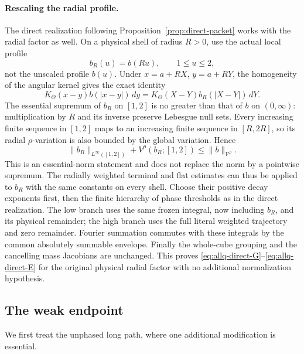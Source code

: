 \documentclass[11pt]{article}
\numberwithin{equation}{section}
\theoremstyle{remark}
\theoremstyle{definition}
\begin{document}
\paragraph{Rescaling the radial profile.}
The direct realization following Proposition~\ref{prop:direct-packet}
works with the radial factor as well.  On a physical shell of radius
$R>0$, use the actual local profile
\[
 b_R(u)=b(Ru),\qquad 1\le u\le2,
\]
not the unscaled profile $b(u)$.  Under $x=a+RX$, $y=a+RY$,
the homogeneity of the angular kernel gives the exact identity
\[
 K_\Theta(x-y)b(|x-y|)\,dy
 =K_\Theta(X-Y)b_R(|X-Y|)\,dY.
\]
The essential supremum of $b_R$ on $[1,2]$ is no greater than that of
$b$ on $(0,\infty)$: multiplication by $R$ and its inverse preserve
Lebesgue null sets.  Every increasing finite sequence in $[1,2]$
maps to an increasing finite sequence in $[R,2R]$, so its radial
$\rho$-variation is also bounded by the global variation.  Hence
\[
 \|b_R\|_{L^\infty([1,2])}+V^\rho(b_R;[1,2])
 \le \|b\|_{\mathcal V^\rho}.
\]
This is an essential-norm statement and does not replace the norm by a
pointwise supremum.  The radially weighted terminal and flat estimates
can thus be applied to $b_R$ with the same constants on every shell.
Choose their positive decay exponents first, then the finite hierarchy
of phase thresholds as in the direct realization.  The low branch uses
the same frozen integral, now including $b_R$, and its physical
remainder; the high branch uses the full literal weighted trajectory
and zero remainder.  Fourier summation commutes with these integrals
by the common absolutely summable envelope.  Finally the whole-cube
grouping and the cancelling mass Jacobians are unchanged.  This proves
\eqref{eq:allq-direct-G}--\eqref{eq:allq-direct-E} for the original
physical radial factor with no additional normalization hypothesis.


\subsection{The weak endpoint}

We first treat the unphased long path, where one additional modification is
essential.
\end{document}
